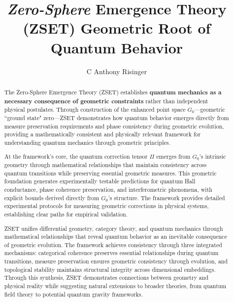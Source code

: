 \documentclass[10pt]{article}
\begin{document}

\begin{opening}

  \author[C Anthony Risinger, \URL{https://zset.space}, e-mail: \URL{c@anthonyrisinger.com}]{C Anthony Risinger}

  \title{\emph{Zero-Sphere} Emergence Theory (ZSET)\newline{} Geometric Root {\normalsize of} Quantum Behavior}

  \begin{abstract}
   The Zero-Sphere Emergence Theory (ZSET) establishes \textbf{quantum mechanics as a necessary consequence of geometric constraints} rather than independent physical postulates. Through construction of the enhanced point space \(G_0\)---geometric ``ground state" zero---ZSET demonstrates how quantum behavior emerges directly from measure preservation requirements and phase consistency during geometric evolution, providing a mathematically consistent and physically relevant framework for understanding quantum mechanics through geometric principles.

   At the framework's core, the quantum correction tensor \(\Pi\) emerges from \(G_0\)'s intrinsic geometry through mathematical relationships that maintain consistency across quantum transitions while preserving essential geometric measures. This geometric foundation generates experimentally testable predictions for quantum Hall conductance, phase coherence preservation, and interferometric phenomena, with explicit bounds derived directly from \(G_0\)'s structure. The framework provides detailed experimental protocols for measuring geometric corrections in physical systems, establishing clear paths for empirical validation.

   ZSET unifies differential geometry, category theory, and quantum mechanics through mathematical relationships that reveal quantum behavior as an inevitable consequence of geometric evolution. The framework achieves consistency through three integrated mechanisms: categorical coherence preserves essential relationships during quantum transitions, measure preservation ensures geometric consistency through evolution, and topological stability maintains structural integrity across dimensional embeddings. Through this synthesis, ZSET demonstrates connections between geometry and physical reality while suggesting natural extensions to broader theories, from quantum field theory to potential quantum gravity frameworks.
  \end{abstract}


\end{opening}
\end{document}

